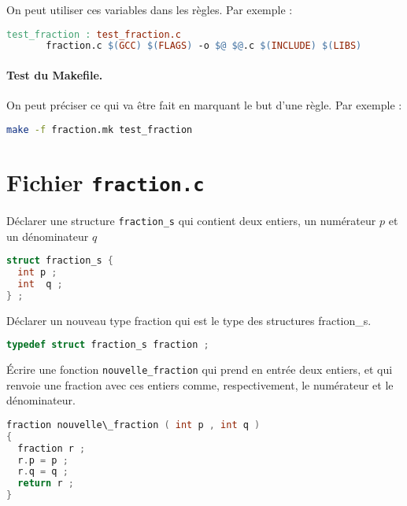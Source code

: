 On peut utiliser ces variables dans les règles. Par exemple :
\begin{lstlisting}[language=make]
test_fraction : test_fraction.c
       fraction.c $(GCC) $(FLAGS) -o $@ $@.c $(INCLUDE) $(LIBS) 
\end{lstlisting}


\paragraph{Test du Makefile.} On peut préciser ce qui va être fait en
marquant le but d’une règle. Par exemple :
\begin{lstlisting}[language=bash]
  make -f fraction.mk test_fraction
\end{lstlisting}

\section{Fichier \texttt{fraction.c}}


\question Déclarer une structure \texttt{fraction\_s} qui contient
deux entiers, un numérateur \(p\) et un dénominateur \(q\)

\begin{solutioncachee}
  \begin{lstlisting}[language=C]
struct fraction_s {
  int p ;
  int  q ;
} ;
  \end{lstlisting}
\end{solutioncachee}

\question Déclarer un nouveau type fraction qui est le type des structures fraction_s.
\begin{solutioncachee}
  \begin{lstlisting}[language=C]
typedef struct fraction_s fraction ;
\end{lstlisting}
\end{solutioncachee}

\question Écrire une fonction \texttt{nouvelle\_fraction} qui prend en
entrée deux entiers, et qui renvoie une fraction avec ces entiers
comme, respectivement, le numérateur et le dénominateur.  

\begin{solutioncachee}
  \begin{lstlisting}[language=C]
fraction nouvelle\_fraction ( int p , int q )
{
  fraction r ;
  r.p = p ;
  r.q = q ;
  return r ;
}
\end{lstlisting}
\end{solutioncachee}

